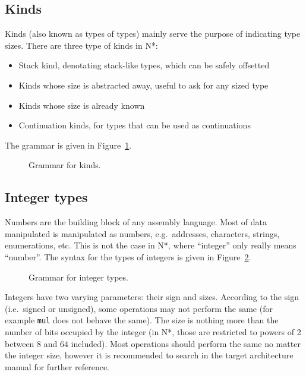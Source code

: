 \subsection{Kinds}\label{subsec:nstar-common-ts-kinds}

Kinds (also known as types of types) mainly serve the purpose of indicating type sizes.
There are three type of kinds in N*:
\begin{itemize}
  \item Stack kind, denotating stack-like types, which can be safely offsetted
  \item Kinds whose size is abstracted away, useful to ask for any sized type
  \item Kinds whose size is already known
  \item Continuation kinds, for types that can be used as continuations
\end{itemize}
The grammar is given in Figure~\ref{fig:nstar-common-ts-kinds-syntax}.

\begin{figure}[htb]
  \centering
  \caption{Grammar for kinds.}
  \label{fig:nstar-common-ts-kinds-syntax}
\end{figure}

\subsection{Integer types}\label{subsec:nstar-common-ts-integer}

Numbers are the building block of any assembly language. Most of data manipulated is manipulated as numbers, e.g.\ addresses, characters, strings, enumerations, etc.
This is not the case in N*, where ``integer''  only really means ``number''.
The syntax for the types of integers is given in Figure~\ref{fig:nstar-common-ts-integer-syntax}.

\begin{figure}[htb]
  \centering
  \caption{Grammar for integer types.}
  \label{fig:nstar-common-ts-integer-syntax}
\end{figure}

Integers have two varying parameters: their sign and sizes.
According to the sign (i.e.\ signed or unsigned), some operations may not perform the same (for example \texttt{mul} does not behave the same).
The size is nothing more than the number of bits occupied by the integer (in N*, those are restricted to powers of 2 between $8$ and $64$ included).
Most operations should perform the same no matter the integer size, however it is recommended to search in the target architecture manual for further reference.

